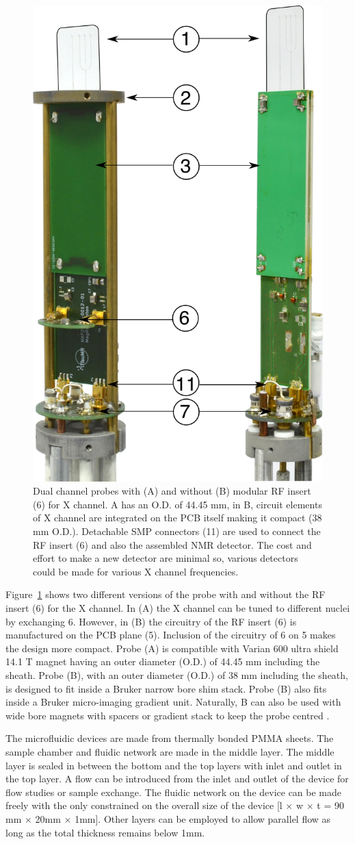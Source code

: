 \documentclass[preprint,12pt]{article}
\begin{document}
\begin{figure}
\centering
\includegraphics[width=.5\linewidth,keepaspectratio=true]{./figures/ms5n17-tlp-im-181007-both-detectors.png}
\caption{Dual channel probes with (A) and without (B) modular RF insert (6) for X channel. A has an O.D. of 44.45 mm, in B, circuit elements of X channel are integrated on the PCB itself making it compact (38 mm O.D.). Detachable SMP connectors (11) are used to connect the RF insert (6) and also the assembled NMR detector. The cost and effort to make a new detector are minimal so, various detectors could be made for various X channel frequencies.}
\label{fig:ProbePhoto}
\end{figure}
Figure~\ref{fig:ProbePhoto} shows two different versions of the probe with and without the RF insert (6) for the X channel. In (A) the X channel can be tuned to different nuclei by exchanging 6. However, in (B) the circuitry of the RF insert (6) is manufactured on the PCB plane (5). Inclusion of the circuitry of 6 on 5 makes the design more compact. Probe (A) is compatible with Varian 600 ultra shield 14.1 T magnet having an outer diameter (O.D.) of 44.45 mm including the sheath. Probe (B), with an outer diameter (O.D.) of 38 mm including the sheath, is designed to fit inside a Bruker narrow bore shim stack. Probe (B) also fits inside a Bruker micro-imaging gradient unit. Naturally, B can also be used with wide bore magnets with spacers or gradient stack to keep the probe centred .\par
The microfluidic devices are made from thermally bonded PMMA sheets. The sample chamber and fluidic network are made in the middle layer. The middle layer is sealed in between the bottom and the top layers with inlet and outlet in the top layer. A flow can be introduced from the inlet and outlet of the device for flow studies or sample exchange. The fluidic network on the device can be made freely with the only constrained on the overall size of the device [l $\times$ w $\times$ t = 90 mm $\times$ 20mm $\times$ 1mm]. Other layers can be employed to allow parallel flow as long as the total thickness remains below 1mm.\par
\end{document}

